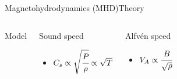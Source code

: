 \documentclass[11pt,table]{beamer}
\begin{document}
\begin{frame}{Magnetohydrodynamics (MHD)}{Theory}
\begin{columns}
\begin{block}{Model}
        \end{block}
        \begin{block}{Sound speed}
            \begin{itemize}
                \item $C_s \propto \sqrt{\cfrac{P}{\rho}} \propto \sqrt{T}$
            \end{itemize}
        \end{block}
        \begin{block}{Alfv\'en speed}
            \begin{itemize}
                \item $V_A \propto \cfrac{B}{\sqrt{\rho}}$
            \end{itemize}
        \end{block}
    \end{columns}
\end{frame}%
\end{document}
